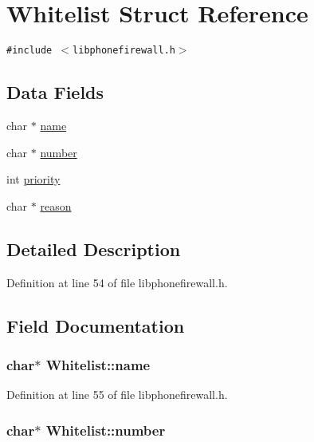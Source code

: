 \hypertarget{structWhitelist}{
\section{Whitelist Struct Reference}
\label{structWhitelist}
}
{\tt \#include $<$libphonefirewall.h$>$}

\subsection*{Data Fields}
\begin{CompactItemize}
\item 
char $\ast$ \hyperlink{structWhitelist_cf7f59535ba0988817c45bd3c16b34d0}{name}
\item 
char $\ast$ \hyperlink{structWhitelist_96bc5db6d72252ff1a9436d61a38597f}{number}
\item 
int \hyperlink{structWhitelist_a88dab00804dbe50d9255e0fa75d1438}{priority}
\item 
char $\ast$ \hyperlink{structWhitelist_22d667946147519356f386dee8a05a17}{reason}
\end{CompactItemize}


\subsection{Detailed Description}


Definition at line 54 of file libphonefirewall.h.

\subsection{Field Documentation}
\hypertarget{structWhitelist_cf7f59535ba0988817c45bd3c16b34d0}{
\subsubsection{\setlength{\rightskip}{0pt plus 5cm}char$\ast$ {\bf Whitelist::name}}}
\label{structWhitelist_cf7f59535ba0988817c45bd3c16b34d0}




Definition at line 55 of file libphonefirewall.h.\hypertarget{structWhitelist_96bc5db6d72252ff1a9436d61a38597f}{
\subsubsection{\setlength{\rightskip}{0pt plus 5cm}char$\ast$ {\bf Whitelist::number}}}
\label{structWhitelist_96bc5db6d72252ff1a9436d61a38597f}




